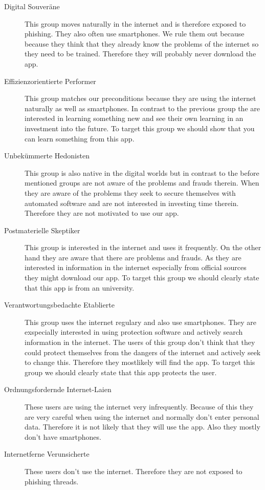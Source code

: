 \begin{description}
\item[Digital Souveräne] This group moves naturally in the internet and is therefore exposed to phishing. They also often use smartphones. We rule them out because because they think that they already know the problems of the internet so they need to be trained. Therefore they will probably never download the app.
\item[Effizienzorientierte Performer] This group matches our preconditions because they are using the internet naturally as well as smartphones. In contrast to the previous group the are interested in learning something new and see their own learning in an investment into the future. To target this group we should show that you can learn something from this app.
\item[Unbekümmerte Hedonisten] This group is also native in the digital worlds but in contrast to the before mentioned groups are not aware of the problems and frauds therein. When they are aware of the problems they seek to secure themselves with automated software and are not interested in investing time therein. Therefore they are not motivated to use our app.
\item[Postmaterielle Skeptiker] This group is interested in the internet and uses it frequently. On the other hand they are aware that there are problems and frauds. As they are interested in information in the internet especially from official sources they might download our app. To target this group we should clearly state that this app is from an university.
\item[Verantwortungsbedachte Etablierte] This group uses the internet regulary and also use smartphones. They are exspecially interested in using protection software and actively search information in the internet. The users of this group don't think that they could protect themselves from the dangers of the internet and actively seek to change this. Therefore they mostlikely will find the app. To target this group we should clearly state that this app protects the user.
\item[Ordnungsfordernde Internet-Laien] These users are using the internet very infrequently. Because of this they are very careful when using the internet and normally don't enter personal data. Therefore it is not likely that they will use the app. Also they mostly don't have smartphones.
\item[Internetferne Verunsicherte] These users don't use the internet. Therefore they are not exposed to phishing threads.
\end{description}

